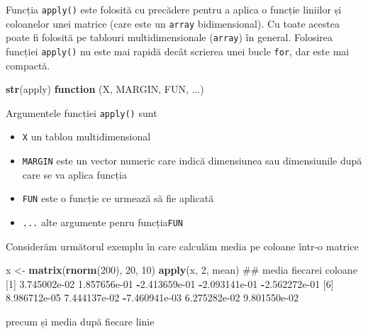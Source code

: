 \documentclass[]{article}
\newenvironment{Shaded}{\begin{snugshade}}{\end{snugshade}}
\newcommand{\KeywordTok}[1]{\textcolor[rgb]{0.13,0.29,0.53}{\textbf{#1}}}
\newcommand{\DecValTok}[1]{\textcolor[rgb]{0.00,0.00,0.81}{#1}}
\newcommand{\FloatTok}[1]{\textcolor[rgb]{0.00,0.00,0.81}{#1}}
\newcommand{\StringTok}[1]{\textcolor[rgb]{0.31,0.60,0.02}{#1}}
\newcommand{\ControlFlowTok}[1]{\textcolor[rgb]{0.13,0.29,0.53}{\textbf{#1}}}
\newcommand{\OperatorTok}[1]{\textcolor[rgb]{0.81,0.36,0.00}{\textbf{#1}}}
\newcommand{\NormalTok}[1]{#1}
\providecommand{\tightlist}{%
  \setlength{\itemsep}{0pt}\setlength{\parskip}{0pt}}
\begin{document}
Funcția \texttt{apply()} este folosită cu precădere pentru a aplica o
funcție liniilor și coloanelor unei matrice (care este un \texttt{array}
bidimensional). Cu toate acestea poate fi folosită pe tablouri
multidimensionale (\texttt{array}) în general. Folosirea funcției
\texttt{apply()} nu este mai rapidă decât scrierea unei bucle
\texttt{for}, dar este mai compactă.

\begin{Shaded}
\begin{Highlighting}[]
\KeywordTok{str}\NormalTok{(apply)}
\ControlFlowTok{function}\NormalTok{ (X, MARGIN, FUN, ...)  }
\end{Highlighting}
\end{Shaded}

Argumentele funcției \texttt{apply()} sunt

\begin{itemize}
\tightlist
\item
  \texttt{X} un tablou multidimensional
\item
  \texttt{MARGIN} este un vector numeric care indică dimensiunea sau
  dimensiunile după care se va aplica funcția
\item
  \texttt{FUN} este o funcție ce urmează să fie aplicată
\item
  \texttt{...} alte argumente penru funcția\texttt{FUN}
\end{itemize}

Considerăm următorul exemplu în care calculăm media pe coloane într-o
matrice

\begin{Shaded}
\begin{Highlighting}[]
\NormalTok{x <-}\StringTok{ }\KeywordTok{matrix}\NormalTok{(}\KeywordTok{rnorm}\NormalTok{(}\DecValTok{200}\NormalTok{), }\DecValTok{20}\NormalTok{, }\DecValTok{10}\NormalTok{)}
\KeywordTok{apply}\NormalTok{(x, }\DecValTok{2}\NormalTok{, mean)  ## media fiecarei coloane}
\NormalTok{ [}\DecValTok{1}\NormalTok{]  }\FloatTok{3.745002e-02}  \FloatTok{1.857656e-01} \OperatorTok{-}\FloatTok{2.413659e-01} \OperatorTok{-}\FloatTok{2.093141e-01} \OperatorTok{-}\FloatTok{2.562272e-01}
\NormalTok{ [}\DecValTok{6}\NormalTok{]  }\FloatTok{8.986712e-05}  \FloatTok{7.444137e-02} \OperatorTok{-}\FloatTok{7.460941e-03}  \FloatTok{6.275282e-02}  \FloatTok{9.801550e-02}
\end{Highlighting}
\end{Shaded}

precum și media după fiecare linie
\end{document}
